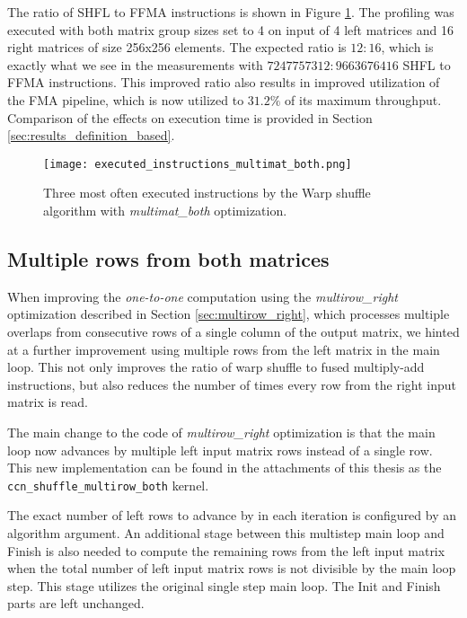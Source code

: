 The ratio of SHFL to FFMA instructions is shown in Figure \ref{fig:multimat_both_executed_instructions}. The profiling was executed with both matrix group sizes set to 4 on input of 4 left matrices and 16 right matrices of size 256x256 elements. The expected ratio is $12 : 16$, which is exactly what we see in the measurements with $7 247 757 312 : 9 663 676 416$ SHFL to FFMA instructions. This improved ratio also results in improved utilization of the FMA pipeline, which is now utilized to
$31.2\%$ of its maximum throughput. Comparison of the effects on execution time is provided in Section \ref{sec:results_definition_based}.

\begin{figure}
	\centering
	\texttt{[image: executed\_instructions\_multimat\_both.png]}
	\caption{Three most often executed instructions by the Warp shuffle algorithm with \textit{multimat\_both} optimization.}
	\label{fig:multimat_both_executed_instructions}
\end{figure}


\subsection{Multiple rows from both matrices}
\label{sec:multirow_both}

When improving the \textit{one-to-one} computation using the \textit{multirow\_right} optimization described in Section \ref{sec:multirow_right}, which processes multiple overlaps from consecutive rows of a single column of the output matrix, we hinted at a further improvement using multiple rows from the left matrix in the main loop. This not only improves the ratio of warp shuffle to fused multiply-add instructions, but also reduces the number of times every row from the right input matrix is read. 

The main change to the code of \textit{multirow\_right} optimization is that the main loop now advances by multiple left input matrix rows instead of a single row. This new implementation can be found in the attachments of this thesis as the \texttt{ccn\_shuffle\_multirow\_both} kernel.

The exact number of left rows to advance by in each iteration is configured by an algorithm argument. An additional stage between this multistep main loop and Finish is also needed to compute the remaining rows from the left input matrix when the total number of left input matrix rows is not divisible by the main loop step. This stage utilizes the original single step main loop. The Init and Finish parts are left unchanged.



